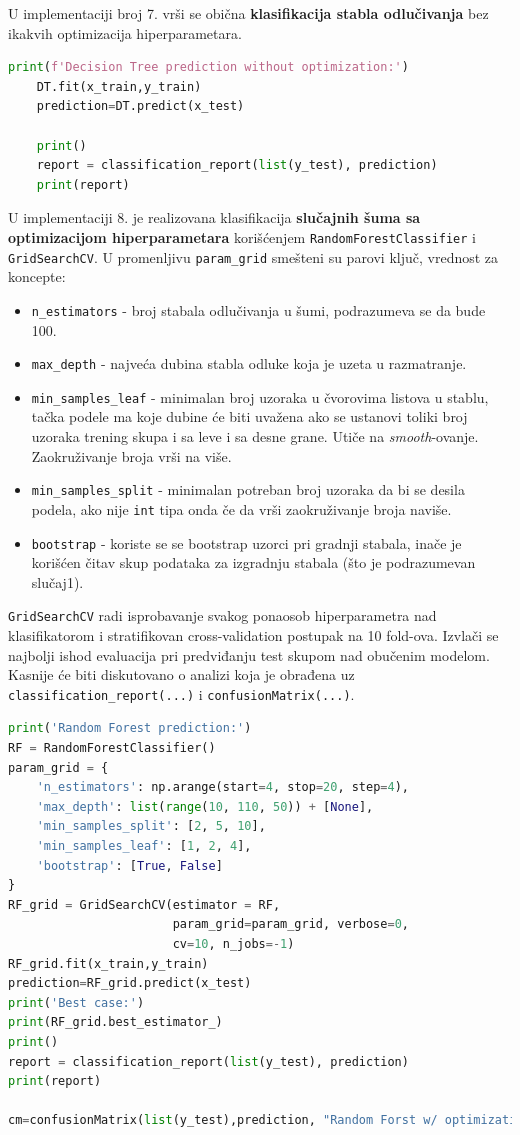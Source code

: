 \documentclass[fontsize=12bp, paper=a4]{scrarticle}
\begin{document}
U implementaciji broj 7. vrši se obična \textbf{klasifikacija stabla odlučivanja} bez ikakvih optimizacija hiperparametara.
\begin{lstlisting}[language=Python, caption=Stablo odlučivanja bez ikakvih optimizacija hiperparametara.]
    print(f'Decision Tree prediction without optimization:')
    DT.fit(x_train,y_train)
    prediction=DT.predict(x_test)
    
    print()
    report = classification_report(list(y_test), prediction)
    print(report)
\end{lstlisting}
U implementaciji 8. je realizovana klasifikacija \textbf{slučajnih šuma sa optimizacijom hiperparametara} korišćenjem \verb|RandomForestClassifier|\cite{RFC} i \verb|GridSearchCV|. U promenljivu \verb|param_grid| smešteni su parovi ključ, vrednost za koncepte:
\begin{itemize}
    \item \verb|n_estimators| - broj stabala odlučivanja u šumi, podrazumeva se da bude 100.
    \item \verb|max_depth| - najveća dubina stabla odluke koja je uzeta u razmatranje.
    \item \verb|min_samples_leaf| -  minimalan broj uzoraka u čvorovima listova u stablu, tačka podele ma koje dubine će biti uvažena ako se ustanovi toliki broj uzoraka trening skupa i sa leve i sa desne grane. Utiče na \textit{smooth}-ovanje. Zaokruživanje broja vrši na više.
    \item \verb|min_samples_split| - minimalan potreban broj uzoraka da bi se desila podela, ako nije \verb*|int| tipa onda če da vrši zaokruživanje broja naviše.
    \item \verb|bootstrap| - koriste se se bootstrap uzorci pri gradnji stabala, inače je korišćen čitav skup podataka za izgradnju stabala (što je podrazumevan slučaj1).
\end{itemize} 
\verb*|GridSearchCV| radi isprobavanje svakog ponaosob hiperparametra nad klasifikatorom i stratifikovan cross-validation postupak na 10 fold-ova. Izvlači se najbolji ishod evaluacija pri predviđanju test skupom nad obučenim modelom. Kasnije će biti diskutovano o analizi koja je obrađena uz \verb|classification_report(...)| i \verb|confusionMatrix(...)|.
\begin{lstlisting}[language=Python, caption=Slučajna šuma sa optimizacijama hiperparametara.]
print('Random Forest prediction:')
RF = RandomForestClassifier()
param_grid = {
    'n_estimators': np.arange(start=4, stop=20, step=4),
    'max_depth': list(range(10, 110, 50)) + [None],
    'min_samples_split': [2, 5, 10],
    'min_samples_leaf': [1, 2, 4],
    'bootstrap': [True, False]
}
RF_grid = GridSearchCV(estimator = RF,
                       param_grid=param_grid, verbose=0, 											
                       cv=10, n_jobs=-1)
RF_grid.fit(x_train,y_train)
prediction=RF_grid.predict(x_test)
print('Best case:')
print(RF_grid.best_estimator_)
print()
report = classification_report(list(y_test), prediction)
print(report)

cm=confusionMatrix(list(y_test),prediction, "Random Forst w/ optimization")
\end{lstlisting}
\end{document}
